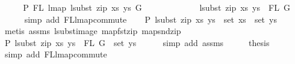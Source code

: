 \begin{isabellebody}
%
\isadelimproof
%
\endisadelimproof
%
\isatagproof
{}\isamarkupfalse%
\ {\isacharminus}{\kern0pt}\isanewline
\ \ \isamarkupfalse%
\ P{}{\isacharcolon}{\kern0pt}\ {\isachardoublequoteopen}FL\ {\isacharparenleft}{\kern0pt}lmap\ {\isacharparenleft}{\kern0pt}lsubst\ {\isacharparenleft}{\kern0pt}zip\ xs\ ys{\isacharparenright}{\kern0pt}{\isacharparenright}{\kern0pt}\ G{\isacharparenright}{\kern0pt}\ {\isacharequal}{\kern0pt}\isanewline
\ \ \ \ \ \ \ \ \ \ \ \ {\isacharparenleft}{\kern0pt}lsubst\ {\isacharparenleft}{\kern0pt}zip\ xs\ ys{\isacharparenright}{\kern0pt}{\isacharparenright}{\kern0pt}\ {\isacharbackquote}{\kern0pt}\ FL\ G{\isachardoublequoteclose}\isanewline
\ \ \ \ \isamarkupfalse%
\ {\isacharparenleft}{\kern0pt}simp\ add{\isacharcolon}{\kern0pt}\ FL{\isacharunderscore}{\kern0pt}lmap{\isacharunderscore}{\kern0pt}commute{\isacharparenright}{\kern0pt}\isanewline
\ \ \isamarkupfalse%
\ P{}{\isacharcolon}{\kern0pt}\ {\isachardoublequoteopen}lsubst\ {\isacharparenleft}{\kern0pt}zip\ xs\ ys{\isacharparenright}{\kern0pt}\ {\isacharbackquote}{\kern0pt}\ set\ xs\ {\isacharequal}{\kern0pt}\ set\ ys{\isachardoublequoteclose}\isanewline
\ \ \ \ \isamarkupfalse%
\ {\isacharparenleft}{\kern0pt}metis\ assms{\isacharparenleft}{\kern0pt}{}{\isacharcomma}{\kern0pt}{}{\isacharparenright}{\kern0pt}\ lsubst{\isacharunderscore}{\kern0pt}image\ map{\isacharunderscore}{\kern0pt}fst{\isacharunderscore}{\kern0pt}zip\ map{\isacharunderscore}{\kern0pt}snd{\isacharunderscore}{\kern0pt}zip{\isacharparenright}{\kern0pt}\isanewline
\ \ \isamarkupfalse%
\ \isamarkupfalse%
\ P{}{\isacharcolon}{\kern0pt}\ {\isachardoublequoteopen}lsubst\ {\isacharparenleft}{\kern0pt}zip\ xs\ ys{\isacharparenright}{\kern0pt}\ {\isacharbackquote}{\kern0pt}\ FL\ G\ {\isacharequal}{\kern0pt}\ set\ ys{\isachardoublequoteclose}\isanewline
\ \ \ \ \isamarkupfalse%
\ {\isacharparenleft}{\kern0pt}simp\ add{\isacharcolon}{\kern0pt}\ assms{\isacharparenleft}{\kern0pt}{}{\isacharparenright}{\kern0pt}{\isacharparenright}{\kern0pt}\isanewline
\ \ \isamarkupfalse%
\ \isamarkupfalse%
\ {\isacharquery}{\kern0pt}thesis\isanewline
\ \ \ \ \isamarkupfalse%
\ {\isacharparenleft}{\kern0pt}simp\ add{\isacharcolon}{\kern0pt}\ FL{\isacharunderscore}{\kern0pt}lmap{\isacharunderscore}{\kern0pt}commute{\isacharparenright}{\kern0pt}\isanewline
{}\isamarkupfalse%

\end{isabellebody}
